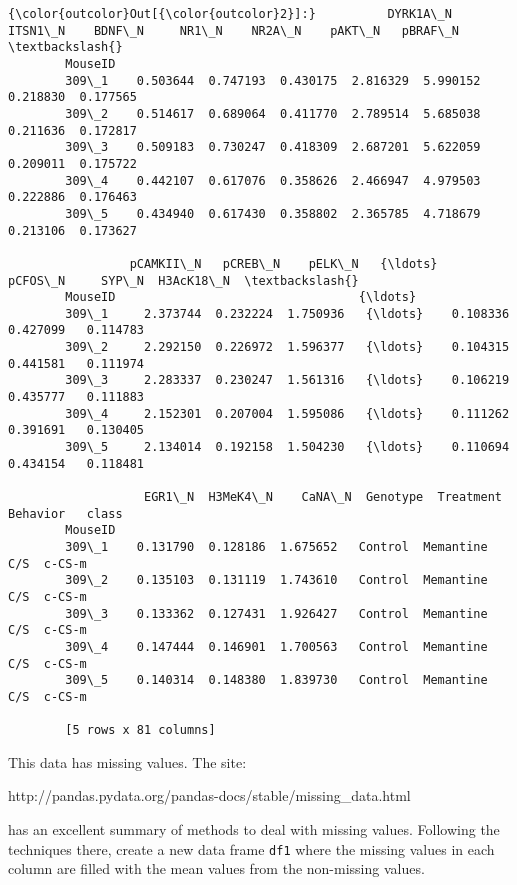 \documentclass[11pt]{article}
\begin{document}
\begin{Verbatim}[commandchars=\\\{\}]
{\color{outcolor}Out[{\color{outcolor}2}]:}          DYRK1A\_N   ITSN1\_N    BDNF\_N     NR1\_N    NR2A\_N    pAKT\_N   pBRAF\_N  \textbackslash{}
        MouseID                                                                         
        309\_1    0.503644  0.747193  0.430175  2.816329  5.990152  0.218830  0.177565   
        309\_2    0.514617  0.689064  0.411770  2.789514  5.685038  0.211636  0.172817   
        309\_3    0.509183  0.730247  0.418309  2.687201  5.622059  0.209011  0.175722   
        309\_4    0.442107  0.617076  0.358626  2.466947  4.979503  0.222886  0.176463   
        309\_5    0.434940  0.617430  0.358802  2.365785  4.718679  0.213106  0.173627   
        
                 pCAMKII\_N   pCREB\_N    pELK\_N   {\ldots}     pCFOS\_N     SYP\_N  H3AcK18\_N  \textbackslash{}
        MouseID                                  {\ldots}                                    
        309\_1     2.373744  0.232224  1.750936   {\ldots}    0.108336  0.427099   0.114783   
        309\_2     2.292150  0.226972  1.596377   {\ldots}    0.104315  0.441581   0.111974   
        309\_3     2.283337  0.230247  1.561316   {\ldots}    0.106219  0.435777   0.111883   
        309\_4     2.152301  0.207004  1.595086   {\ldots}    0.111262  0.391691   0.130405   
        309\_5     2.134014  0.192158  1.504230   {\ldots}    0.110694  0.434154   0.118481   
        
                   EGR1\_N  H3MeK4\_N    CaNA\_N  Genotype  Treatment  Behavior   class  
        MouseID                                                                       
        309\_1    0.131790  0.128186  1.675652   Control  Memantine       C/S  c-CS-m  
        309\_2    0.135103  0.131119  1.743610   Control  Memantine       C/S  c-CS-m  
        309\_3    0.133362  0.127431  1.926427   Control  Memantine       C/S  c-CS-m  
        309\_4    0.147444  0.146901  1.700563   Control  Memantine       C/S  c-CS-m  
        309\_5    0.140314  0.148380  1.839730   Control  Memantine       C/S  c-CS-m  
        
        [5 rows x 81 columns]
\end{Verbatim}
            
    This data has missing values. The site:

http://pandas.pydata.org/pandas-docs/stable/missing\_data.html

has an excellent summary of methods to deal with missing values.
Following the techniques there, create a new data frame \texttt{df1}
where the missing values in each column are filled with the mean values
from the non-missing values.
\end{document}
